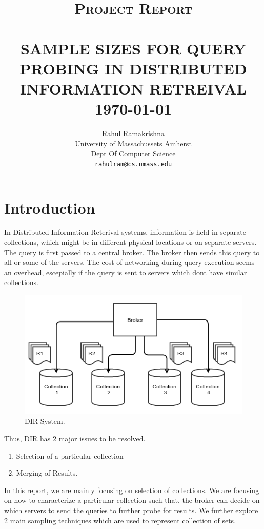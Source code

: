 \documentclass[paper=a4, fontsize=11pt,twoside]{scrartcl}	%
\title{	\normalsize \textsc{Project Report} 	%
		 	\\[2.0cm]								%
			\HRule{0.5pt} \\						%
			\LARGE \textbf{\uppercase{Sample Sizes for Query Probing in Distributed Information Retreival}}	%
			\HRule{2pt} \\ [0.5cm]		%
			\normalsize \today			%
		}
\author{
		Rahul Ramakrishna\\	
		University of Massachussets Amherst\\	
		Dept Of Computer Science\\
        \texttt{rahulram@cs.umass.edu} \\
}
\makeatletter
\def\printtitle{%
    {\centering \@title\par}}
\def\printauthor{%
    {\centering \large \@author}}
\makeatother
\begin{document}
\thispagestyle{empty}		%

\printtitle					%
  	\vfill
\printauthor				%
\newpage
\setcounter{page}{1}		%
\section{Introduction}

In Distributed Information Reterival systems, information is held in separate collections, which might be in different physical locations or on separate servers. The query is first passed to a central
broker. The broker then sends this query to all or some of the servers. The cost of networking during query execution seems an overhead, escepially if the query is sent to servers which dont have similar collections.

\begin{figure}[H]
\centering
\includegraphics[width=\textwidth]{./img/ir.png}
\caption{\label{fig:1}DIR System.}
\end{figure}


Thus, DIR has 2 major issues to be resolved. 
\begin{enumerate}
\item Selection of a particular collection
\item Merging of Results.
\end{enumerate}
In this report, we are mainly focusing on selection of collections. We are focusing on how to characterize a 
particular collection such that, the broker can decide on which servers to send the queries to further probe for 
results. We further explore 2 main sampling techniques which are used to represent collection of sets.
\end{document}
